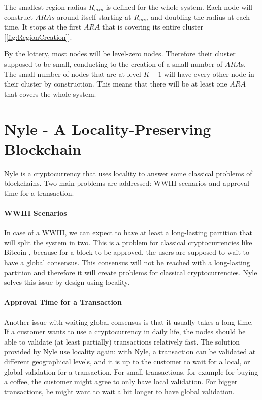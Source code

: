 \documentclass[a4paper,11pt,oneside]{report}
\begin{document}
The smallest region radius $R_{min}$ is defined for the whole system. Each node
will construct $ARAs$ around itself starting at $R_{min}$ and doubling the
radius at each time. It stops at the first $ARA$ that is covering its entire
cluster [\autoref{fig:RegionCreation}]. 

By the lottery, most nodes will be level-zero nodes. Therefore their cluster
supposed to be small, conducting to the creation of a small number of $ARA$s.
The small number of nodes that are at level $K-1$ will have every other node
in their cluster by construction. This means that there will be at least one
$ARA$ that covers the whole system. 

\section{Nyle - A Locality-Preserving Blockchain}

Nyle is a cryptocurrency that uses locality to answer some classical problems
of blockchains. Two main problems are addressed: WWIII scenarios and approval
time for a transaction.
 
\paragraph{WWIII Scenarios} \label{WWIII} In case of a WWIII, we can expect to
have at least a long-lasting partition that will split the system in two. This
is a problem for classical cryptocurrencies like Bitcoin \cite{Nakamoto2009},
because for a block to be approved, the users are supposed to wait to have a
global consensus. This consensus will not be reached with a long-lasting
partition and therefore it will create problems for classical cryptocurrencies.
Nyle solves this issue by design using locality.

\paragraph{Approval Time for a Transaction} \label{approve_time} Another issue
with waiting global consensus is that it usually takes a long time. If a
customer wants to use a cryptocurrency in daily life, the nodes should be able
to validate (at least partially) transactions relatively fast. The solution
provided by Nyle use locality again: with Nyle, a transaction can be validated
at different geographical levels, and it is up to the customer to wait for a
local, or global validation for a transaction. For small transactions, for
example for buying a coffee, the customer might agree to only have local
validation. For bigger transactions, he might want to wait a bit longer to have
global validation.
\end{document}
